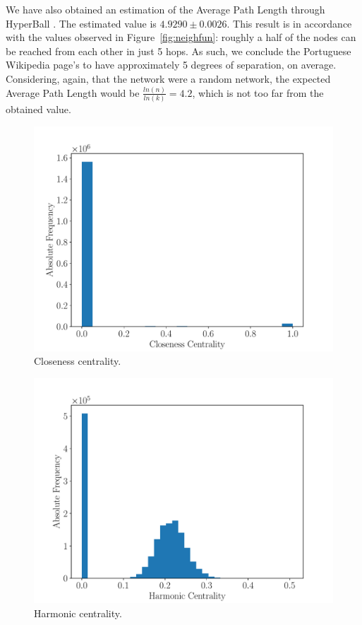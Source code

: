 \documentclass[9pt,a4paper,twocolumn]{article}
\begin{document}
We have also obtained an estimation of the Average Path Length through HyperBall \cite{DBLP:conf/icdm/BoldiV13}. The estimated value is $ 4.9290 \pm 0.0026 $. This result is in accordance with the values observed in Figure~\ref{fig:neighfun}: roughly a half of the nodes can be reached from each other in just 5 hops. As such, we conclude the Portuguese Wikipedia page's to have approximately 5 degrees of separation, on average. Considering, again, that the network were a random network, the expected Average Path Length would be $\frac{ln(n)}{ln(k)} = 4.2$, which is not too far from the obtained value.


\begin{figure}[h]
	\centering
	\includegraphics[width=\linewidth]{wikipedia_pt_closeness_centrality.pdf}
	\caption{Closeness centrality.}
	\label{fig:closeness}
\end{figure}

\begin{figure}[h]
	\centering
	\includegraphics[width=\linewidth]{wikipedia_pt_harmonic_centrality.pdf}
	\caption{Harmonic centrality.}
	\label{fig:harmonic}
\end{figure}
\end{document}
